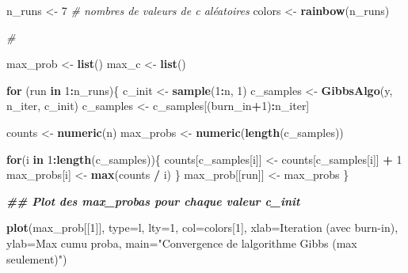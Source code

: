 \documentclass[
]{article}
\newenvironment{Shaded}{\begin{snugshade}}{\end{snugshade}}
\newcommand{\AttributeTok}[1]{\textcolor[rgb]{0.13,0.29,0.53}{#1}}
\newcommand{\CommentTok}[1]{\textcolor[rgb]{0.56,0.35,0.01}{\textit{#1}}}
\newcommand{\ControlFlowTok}[1]{\textcolor[rgb]{0.13,0.29,0.53}{\textbf{#1}}}
\newcommand{\DecValTok}[1]{\textcolor[rgb]{0.00,0.00,0.81}{#1}}
\newcommand{\DocumentationTok}[1]{\textcolor[rgb]{0.56,0.35,0.01}{\textbf{\textit{#1}}}}
\newcommand{\FunctionTok}[1]{\textcolor[rgb]{0.13,0.29,0.53}{\textbf{#1}}}
\newcommand{\NormalTok}[1]{#1}
\newcommand{\OtherTok}[1]{\textcolor[rgb]{0.56,0.35,0.01}{#1}}
\newcommand{\SpecialCharTok}[1]{\textcolor[rgb]{0.81,0.36,0.00}{\textbf{#1}}}
\newcommand{\StringTok}[1]{\textcolor[rgb]{0.31,0.60,0.02}{#1}}
\begin{document}
\begin{Shaded}
\begin{Highlighting}[]
\NormalTok{n\_runs }\OtherTok{\textless{}{-}} \DecValTok{7} \CommentTok{\# nombres de valeurs de c aléatoires}
\NormalTok{colors }\OtherTok{\textless{}{-}} \FunctionTok{rainbow}\NormalTok{(n\_runs)}

\CommentTok{\#}

\NormalTok{max\_prob }\OtherTok{\textless{}{-}} \FunctionTok{list}\NormalTok{()}
\NormalTok{max\_c    }\OtherTok{\textless{}{-}} \FunctionTok{list}\NormalTok{()}

\ControlFlowTok{for}\NormalTok{ (run }\ControlFlowTok{in} \DecValTok{1}\SpecialCharTok{:}\NormalTok{n\_runs)\{}
\NormalTok{  c\_init }\OtherTok{\textless{}{-}} \FunctionTok{sample}\NormalTok{(}\DecValTok{1}\SpecialCharTok{:}\NormalTok{n, }\DecValTok{1}\NormalTok{)}
\NormalTok{  c\_samples }\OtherTok{\textless{}{-}} \FunctionTok{GibbsAlgo}\NormalTok{(y, n\_iter, c\_init)}
\NormalTok{  c\_samples }\OtherTok{\textless{}{-}}\NormalTok{ c\_samples[(burn\_in}\SpecialCharTok{+}\DecValTok{1}\NormalTok{)}\SpecialCharTok{:}\NormalTok{n\_iter]}
  
\NormalTok{  counts }\OtherTok{\textless{}{-}} \FunctionTok{numeric}\NormalTok{(n)}
\NormalTok{  max\_probs }\OtherTok{\textless{}{-}} \FunctionTok{numeric}\NormalTok{(}\FunctionTok{length}\NormalTok{(c\_samples))}
  
  \ControlFlowTok{for}\NormalTok{(i }\ControlFlowTok{in} \DecValTok{1}\SpecialCharTok{:}\FunctionTok{length}\NormalTok{(c\_samples))\{}
\NormalTok{    counts[c\_samples[i]] }\OtherTok{\textless{}{-}}\NormalTok{ counts[c\_samples[i]] }\SpecialCharTok{+} \DecValTok{1}
\NormalTok{    max\_probs[i] }\OtherTok{\textless{}{-}} \FunctionTok{max}\NormalTok{(counts }\SpecialCharTok{/}\NormalTok{ i)}
\NormalTok{  \}}
\NormalTok{  max\_prob[[run]] }\OtherTok{\textless{}{-}}\NormalTok{ max\_probs}
\NormalTok{\}}

\DocumentationTok{\#\# Plot des max\_probas pour chaque valeur c\_init}

\FunctionTok{plot}\NormalTok{(max\_prob[[}\DecValTok{1}\NormalTok{]], }\AttributeTok{type=}\StringTok{\textquotesingle{}l\textquotesingle{}}\NormalTok{, }\AttributeTok{lty=}\DecValTok{1}\NormalTok{, }\AttributeTok{col=}\NormalTok{colors[}\DecValTok{1}\NormalTok{],}
     \AttributeTok{xlab=}\StringTok{\textquotesingle{}Iteration (avec burn{-}in)\textquotesingle{}}\NormalTok{, }\AttributeTok{ylab=}\StringTok{\textquotesingle{}Max cumu proba\textquotesingle{}}\NormalTok{,}
     \AttributeTok{main=}\StringTok{"Convergence de l\textquotesingle{}algorithme Gibbs (max seulement)"}\NormalTok{)}


\end{Highlighting}
\end{Shaded}
\end{document}
